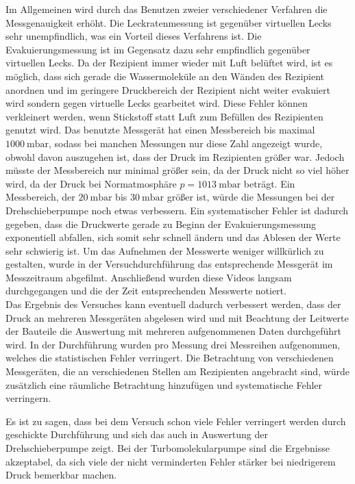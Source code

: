 \noindent Im Allgemeinen wird durch das Benutzen zweier verschiedener Verfahren die Messgenauigkeit erhöht. Die Leckratenmessung ist gegenüber virtuellen Lecks sehr unempfindlich, was 
ein Vorteil dieses Verfahrens ist. 
Die Evakuierungsmessung ist im Gegensatz dazu sehr empfindlich gegenüber virtuellen Lecks. Da der Rezipient immer wieder mit Luft belüftet wird, ist es möglich, dass sich gerade die Wassermoleküle 
an den Wänden des Rezipient anordnen und im geringere Druckbereich der Rezipient nicht weiter evakuiert wird sondern gegen virtuelle Lecks gearbeitet wird. 
Diese Fehler können verkleinert werden, wenn Stickstoff statt Luft zum Befüllen des Rezipienten genutzt wird. 
Das benutzte Messgerät hat einen Messbereich bis maximal $\SI{1000}{\milli\bar}$, sodass bei manchen Messungen nur diese Zahl angezeigt wurde, obwohl davon auszugehen ist, dass der Druck 
im Rezipienten größer war. Jedoch müsste der Messbereich nur minimal größer sein, da der Druck nicht so viel höher wird, da der Druck bei Normatmosphäre $p = \SI{1013}{\milli\bar}$ beträgt. 
Ein Messbereich, der $\SI{20}{\milli\bar}$ bis $\SI{30}{\milli\bar}$ größer ist, würde die Messungen bei der Drehschieberpumpe noch etwas verbessern. 
Ein systematischer Fehler ist dadurch gegeben, dass die Druckwerte gerade zu Beginn der Evakuierungsmessung exponentiell abfallen, sich somit sehr schnell ändern und das Ablesen der Werte 
sehr schwierig ist. Um das Aufnehmen der Messwerte weniger willkürlich zu gestalten, wurde in der Versuchdurchführung das entsprechende Messgerät im Messzeitraum abgefilmt. Anschließend 
wurden diese Videos langsam durchgegangen und die der Zeit entsprechenden Messwerte notiert. \\
Das Ergebnis des Versuches kann eventuell dadurch verbessert werden, dass der Druck an mehreren Messgeräten abgelesen wird und mit Beachtung der Leitwerte der Bauteile die Auswertung mit 
mehreren aufgenommenen Daten durchgeführt wird. In der Durchführung wurden pro Messung drei Messreihen aufgenommen, welches die statistischen Fehler verringert. Die Betrachtung von 
verschiedenen Messgeräten, die an verschiedenen Stellen am Rezipienten angebracht sind, würde zusätzlich eine räumliche Betrachtung hinzufügen und systematische Fehler verringern. 

\noindent Es ist zu sagen, dass bei dem Versuch schon viele Fehler verringert werden durch geschickte Durchführung und sich das auch in Auswertung der Drehschieberpumpe zeigt. Bei der 
Turbomolekularpumpe sind die Ergebnisse akzeptabel, da sich viele der nicht verminderten Fehler stärker bei niedrigerem Druck bemerkbar machen. 